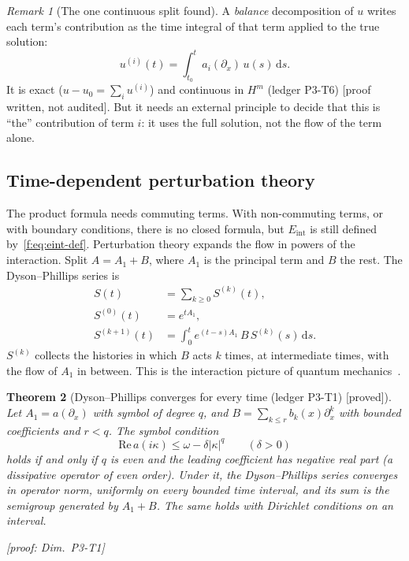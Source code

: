 \documentclass[11pt]{article}
\theoremstyle{plain}
\newtheorem{theorem}{Theorem}[section]
\theoremstyle{definition}
\theoremstyle{remark}
\newtheorem{remark}[theorem]{Remark}
\newcommand{\dd}{\,\mathrm{d}}
\newcommand{\Eint}{E_{\mathrm{int}}}        %
\newcommand{\badge}[2]{\textcolor{#1}{\textsf{\footnotesize[#2]}}}
\newcommand{\proved}[1][]{\badge{cC}{proved#1}}
\newcommand{\led}[1]{\textcolor{cG}{\textsf{\footnotesize(ledger #1)}}}
\newenvironment{aside}[1]{\begin{remark}[#1]}{\end{remark}}
\newcommand{\dimref}[1]{\textsf{\footnotesize[proof: Dim.~#1]}}
\newcommand{\pw}{\badge{cD}{proof written, not audited}}
\begin{document}
\begin{aside}{The one continuous split found}
A \emph{balance} decomposition of $u$ writes each term's contribution as the time integral of that term applied to the true solution:
\[
u^{(i)}(t)=\int_{t_0}^{t}a_i(\partial_x)\,u(s)\dd s .
\]
It is exact ($u-u_0=\sum_iu^{(i)}$) and continuous in $H^m$ \led{P3-T6} \pw. But it needs an external principle to decide that this is ``the'' contribution of term $i$: it uses the full solution, not the flow of the term alone.
\end{aside}

\subsection{Time-dependent perturbation theory}

The product formula needs commuting terms. With non-commuting terms, or with boundary conditions, there is no closed formula, but $\Eint$ is still defined by~\eqref{f:eq:eint-def}. Perturbation theory expands the flow in powers of the interaction. Split $A=A_1+B$, where $A_1$ is the principal term and $B$ the rest. The Dyson--Phillips series is
\begin{equation}\label{f:eq:dyson}
\begin{aligned}
S(t)&=\sum_{k\ge0}S^{(k)}(t),\\
S^{(0)}(t)&=e^{tA_1},\\
S^{(k+1)}(t)&=\int_0^te^{(t-s)A_1}\,B\,S^{(k)}(s)\dd s .
\end{aligned}
\end{equation}
$S^{(k)}$ collects the histories in which $B$ acts $k$ times, at intermediate times, with the flow of $A_1$ in between. This is the interaction picture of quantum mechanics~\cite{dy}.

\begin{theorem}[{Dyson--Phillips converges for every time \led{P3-T1} \proved}]\label{thm:dyson}
Let $A_1=a(\partial_x)$ with symbol of degree $q$, and $B=\sum_{k\le r}b_k(x)\partial_x^k$ with bounded coefficients and $r<q$. The symbol condition
\[
\mathrm{Re}\,a(i\kappa)\le\omega-\delta|\kappa|^q\qquad(\delta>0)
\]
holds if and only if $q$ is even and the leading coefficient has negative real part (a dissipative operator of even order). Under it, the Dyson--Phillips series converges in operator norm, uniformly on every bounded time interval, and its sum is the semigroup generated by $A_1+B$. The same holds with Dirichlet conditions on an interval.

\dimref{P3-T1}
\end{theorem}
\end{document}
